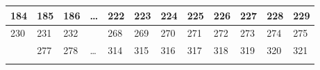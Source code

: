 \begin{table}[]
\begin{tabular}{llllllllllll}
    \multicolumn{1}{|l|}{\cellcolor[HTML]{F8FF00}184} & \multicolumn{1}{l|}{185}                         & \multicolumn{1}{l|}{186}                         & \multicolumn{1}{l|}{…}                         & \multicolumn{1}{l|}{222}                         & \multicolumn{1}{l|}{223}                         & \multicolumn{1}{l|}{224}                         & \multicolumn{1}{l|}{225}                         & \multicolumn{1}{l|}{\cellcolor[HTML]{FFFFC7}226} & \multicolumn{1}{l|}{227}                         & \multicolumn{1}{l|}{228}                         & \multicolumn{1}{l|}{229}                         \\ \hline
    \multicolumn{1}{|l|}{\cellcolor[HTML]{F8FF00}230} & \multicolumn{1}{l|}{\cellcolor[HTML]{FFFFFF}231} & \multicolumn{1}{l|}{\cellcolor[HTML]{FFFFFF}232} & \multicolumn{1}{l|}{\cellcolor[HTML]{FFFFFF}}  & \multicolumn{1}{l|}{\cellcolor[HTML]{FFFFFF}268} & \multicolumn{1}{l|}{\cellcolor[HTML]{FFFFC7}269} & \multicolumn{1}{l|}{\cellcolor[HTML]{FFFFC7}270} & \multicolumn{1}{l|}{\cellcolor[HTML]{FFFFC7}271} & \multicolumn{1}{l|}{\cellcolor[HTML]{FFFFC7}272} & \multicolumn{1}{l|}{\cellcolor[HTML]{F8FF00}273} & \multicolumn{1}{l|}{\cellcolor[HTML]{F8FF00}274} & \multicolumn{1}{l|}{\cellcolor[HTML]{F8FF00}275} \\ \hline
    \rowcolor[HTML]{FFFFFF} 
    \multicolumn{1}{|l|}{\cellcolor[HTML]{F8FF00}276} & \multicolumn{1}{l|}{\cellcolor[HTML]{34FF34}277} & \multicolumn{1}{l|}{\cellcolor[HTML]{FFFFFF}278} & \multicolumn{1}{l|}{\cellcolor[HTML]{FFFFFF}…} & \multicolumn{1}{l|}{\cellcolor[HTML]{FFFFFF}314} & \multicolumn{1}{l|}{\cellcolor[HTML]{FFFFFF}315} & \multicolumn{1}{l|}{\cellcolor[HTML]{FFFFFF}316} & \multicolumn{1}{l|}{\cellcolor[HTML]{FFFFFF}317} & \multicolumn{1}{l|}{\cellcolor[HTML]{FFFFFF}318} & \multicolumn{1}{l|}{\cellcolor[HTML]{FFFFFF}319} & \multicolumn{1}{l|}{\cellcolor[HTML]{FFFFFF}320} & \multicolumn{1}{l|}{\cellcolor[HTML]{FFFFFF}321} \\ \hline
                                                      &                                                  &                                                  &                                                &                                                  &                                                  &                                                  &                                                  &                                                  &                                                  &                                                  &                                                  \\

\end{tabular}
\end{table}
